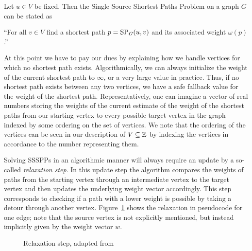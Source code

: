 \begin{definition}\label{def:ssspps}
    Let $u \in V$ be fixed. Then the Single Source Shortest Paths Problem on a graph $G$ can be stated as
    \begin{displayquote}
        ``For all $v \in V$ find a shortest path $p = \operatorname{SP}_G(u, v)$ and its associated weight $\omega(p)$.''
    \end{displayquote}
\end{definition}

At this point we have to pay our dues by explaining how we handle vertices for which no shortest path exists.
Algorithmically, we can always initialize the weight of the current shortest path to $\infty$, or a very large value in practice.
Thus, if no shortest path exists between any two vertices, we have a safe fallback value for the weight of the shortest path.
Representatively, one can imagine a vector of real numbers storing the weights of the current estimate of the weight of the shortest paths from our starting vertex to every possible target vertex in the graph indexed by some ordering on the set of vertices.
We note that the ordering of the vertices can be seen in our description of $V \subseteq \mathbb{Z}$ by indexing the vertices in accordance to the number representing them.

Solving SSSPPs in an algorithmic manner will always require an update by a so-called \emph{relaxation step}.
In this update step the algorithm compares the weights of paths from the starting vertex through an intermediate vertex to the target vertex and then updates the underlying weight vector accordingly.
This step corresponds to checking if a path with a lower weight is possible by taking a detour through another vertex.
Figure~\ref{alg:relaxation} shows the relaxation in pseudocode for one edge; note that the source vertex is not explicitly mentioned, but instead implicitly given by the weight vector $w$.

\begin{figure}[ht]
    \centering
    \begin{minipage}{.4\textwidth}
        \begin{algorithm}[H]
        \end{algorithm}
    \end{minipage}
    \caption{Relaxation step, adapted from~\cite[Chapter~24]{Cormen2001}\label{alg:relaxation}}
\end{figure}

